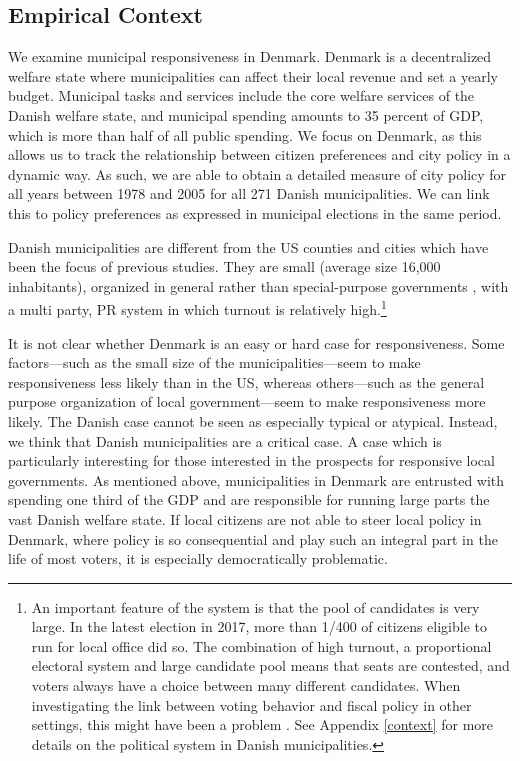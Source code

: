 \documentclass[a4paper,12pt]{article}
\begin{document}
\subsection*{Empirical Context}
We examine municipal responsiveness in Denmark. Denmark is a decentralized welfare state where municipalities can affect their local revenue and set a yearly budget.  Municipal tasks and services include the core welfare services of the Danish welfare state, and municipal spending amounts to 35 percent of GDP, which is more than half of all public spending. We focus on Denmark, as this allows us to track the relationship between citizen preferences and city policy in a dynamic way. As such, we are able to obtain a detailed measure of city policy for all years between 1978 and 2005 for all 271 Danish municipalities.  We can link this to policy preferences as expressed in municipal elections in the same period.
 

Danish municipalities are different from the US counties and cities which have been the focus of previous studies. They are small (average size 16,000 inhabitants), organized in general rather than special-purpose governments \citep{berry2009imperfect}, with a multi party, PR system in which turnout is relatively high.\footnote{An important feature of the system is that the pool of candidates is very large. In the latest election in 2017, more than 1/400 of citizens eligible to run for local office did so. The combination of high turnout, a proportional electoral system and large candidate pool means that seats are contested, and voters always have a choice between many different candidates. When investigating the link between voting behavior and fiscal policy in other settings, this might have been a problem \citep[see][]{suzuki2018does}. See Appendix \ref{context} for more details on the political system in Danish municipalities.} 


It is not clear whether Denmark is an easy or hard case for responsiveness.  Some factors---such as the small size of the municipalities---seem to make responsiveness less likely than in the US, whereas others---such as the general purpose organization of local government---seem to make responsiveness more likely. The Danish case cannot be seen as especially typical or atypical. Instead, we think that Danish municipalities are a critical case. A case which is particularly interesting for those interested in the prospects for responsive local governments. As mentioned above, municipalities in Denmark are entrusted with spending one third of the GDP and are responsible for running large parts the vast Danish welfare state. If local citizens are not able to steer local policy in Denmark, where policy is so consequential and play such an integral part in the life of most voters, it is especially democratically problematic.
\end{document}
